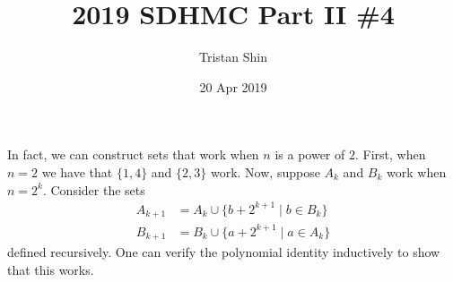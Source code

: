 \documentclass[a4paper, 12pt]{article}
\title{2019 SDHMC Part II \#4}
\author{Tristan Shin}
\date{20 Apr 2019}
\begin{document}
\maketitle


\hrulefill

\begin{solution}
\end{solution}

\begin{remark}
In fact, we can construct sets that work when $n$ is a power of $2$. First, when $n=2$ we have that $\{1,4\}$ and $\{2,3\}$ work. Now, suppose $A_k$ and $B_k$ work when $n=2^k$. Consider the sets
\begin{align*}
	A_{k+1}&=A_k\cup\{b+2^{k+1}\mid b\in B_k\}\\
	B_{k+1}&=B_k\cup\{a+2^{k+1}\mid a\in A_k\}
\end{align*}
defined recursively. One can verify the polynomial identity inductively to show that this works.
\end{remark}
\end{document}
